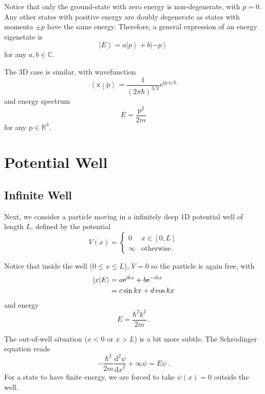 \documentclass{article}
\theoremstyle{plain}\theoremheaderfont{\normalfont\itshape}\theorembodyfont{\rmfamily}\theoremseparator{.}\newtheorem*{rem}{Remark}\newtheorem*{ex}{Example}\newtheorem*{proof}{Proof}\newtheorem*{altp}{Alternative proof}
\theoremstyle{plain}\theoremheaderfont{\normalfont\bfseries}\theorembodyfont{\rmfamily}\theoremseparator{.}\newtheorem{thm}{Theorem}[section]\newtheorem{lem}[thm]{Lemma}\newtheorem{prop}[thm]{Proposition}\newtheorem*{cor}{Corollary}\newtheorem{defn}[thm]{Definition}\newtheorem{clm}[thm]{Claim}\newtheorem{clminproof}{Claim}
\theoremstyle{break}\theoremheaderfont{\normalfont\itshape}\theorembodyfont{\rmfamily}\theoremseparator{.\medskip}\newtheorem*{proofskip}{Proof}\newtheorem*{exs}{Examples}\newtheorem*{rems}{Remarks}
\theoremstyle{break}\theoremheaderfont{\normalfont\bfseries}\theorembodyfont{\rmfamily}\theoremseparator{.\medskip}\newtheorem{lemskip}[thm]{Lemma}\newtheorem{defnskip}[thm]{Definition}\newtheorem{propskip}[thm]{Proposition}\newtheorem{thmskip}[thm]{Theorem}
\numberwithin{equation}{section}
\newcommand{\ii}{\mathrm{i}}
\newcommand{\ee}{\mathrm{e}}
\newcommand{\dv}[3][]{\frac{\mathrm{d}^{#1} #2}{{\mathrm{d} #3}^{#1}}}
\newcommand{\ket}[1]{\left| #1 \right\rangle}
\newcommand{\braket}[2]{\left\langle #1 \middle| #2 \right\rangle}
\newcommand{\vb}[1]{\bm{\mathrm{#1}}}
\newcommand{\vdot}{\bm{\cdot}}
\begin{document}
    Notice that only the ground-state with zero energy is non-degenerate, with \(p=0\). Any other states with positive energy are doubly degenerate as states with momenta \(\pm p\) have the same energy. Therefore, a general expression of an energy eigenstate is
    \begin{equation}
        \ket{E}=a\ket{p}+b\ket{-p}
    \end{equation}
    for any \(a,b\in\mathbb{C}\).

    The 3D case is similar, with wavefunction
    \begin{equation}
        \braket{\vb{x}}{\vb{p}}=\frac{1}{(2\pi\hbar)^{3/2}}\ee^{\ii\vb{p}\vdot\vb{x}/\hbar}
    \end{equation}
    and energy spectrum
    \begin{equation}
        E=\frac{\vb{p}^2}{2m}
    \end{equation}
    for any \(\vb{p}\in\mathbb{R}^3\).

    \newpage
    \section{Potential Well}
    \subsection{Infinite Well}
    Next, we consider a particle moving in a infinitely deep 1D potential well of length \(L\), defined by the potential
    \begin{equation}
        V(x)=\begin{cases}
            0 & x\in[0,L] \\
            \infty & \text{otherwise.}
        \end{cases}
    \end{equation}

    Notice that inside the well (\(0\le x\le L\)), \(V=0\) so the particle is again free, with
    \begin{align}
        \braket{x}{E}&=a\ee^{\ii kx}+b\ee^{-\ii kx}\notag\\
        &=c\sin kx+ d\cos kx
    \end{align}
    and energy
    \begin{equation}
        E=\frac{\hbar^2 k^2}{2m}\,.
    \end{equation}
    
    The out-of-well situation (\(x<0\) or \(x>L\)) is a bit more subtle. The Schr\"{o}dinger equation reads
    \begin{equation}
        -\frac{\hbar^2}{2m}\dv[2]{\psi}{x}+\infty\psi=E\psi\,.
    \end{equation}
    For a state to have finite energy, we are forced to take \(\psi(x)=0\) outside the well.
\end{document}
